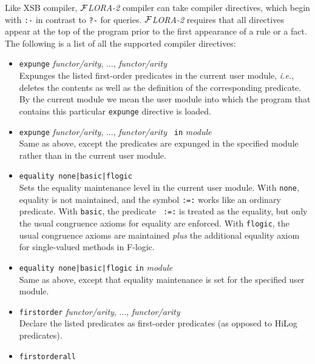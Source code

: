 \documentclass[11pt]{article}
\newcommand{\FLORA}{{\mbox{${\cal F}${\small\it LORA}\rm\emph{-2}}}\xspace}
\newcommand{\fl}{\mbox{F-logic}\xspace}
\begin{document}
%
%
Like XSB compiler, \FLORA compiler can take compiler directives, which
begin with {\tt :-} in contrast to {\tt ?-} for queries.  \FLORA requires
that all directives appear at the top of the program prior to the first
appearance of a rule or a fact.  The following is a list of all the supported
compiler directives:
\begin{itemize}
\item {\tt expunge} {\em functor/arity}, ..., {\em functor/arity}
  \\
  Expunges the listed first-order predicates in the current user
  module, {\it i.e.}, deletes the contents as well as the definition of the
  corresponding predicate. By the current module we mean the user module into
  which the program that contains this particular {\tt expunge} directive
  is loaded.
\item {\tt expunge} {\em functor/arity}, ..., {\em functor/arity} {\tt
    in} \emph{module}\\
  Same as above, except the predicates are expunged in the specified
    module rather than in the current user module.
  \item {\tt equality none|basic|flogic}
    \\
    Sets the equality maintenance level in the current user module.
    With {\tt none}, equality is not maintained, and the symbol {\tt :=:}
    works like an ordinary predicate.  With {\tt basic}, the predicate {\tt
      :=:} is treated as the equality, but only the usual congruence axioms
    for equality are enforced. With {\tt flogic}, the usual congruence
    axioms are maintained \emph{plus} the additional equality axiom for
    single-valued methods in \fl.
\item {\tt equality none|basic|flogic} {\tt in}  \emph{module}
  \\
  Same as above, except that equality maintenance is set for the specified
  user module.
\item {\tt firstorder} {\em functor/arity}, ..., {\em functor/arity}
  \\
  Declare the listed predicates as first-order predicates (as opposed to HiLog
  predicates).
\item {\tt firstorderall}

\end{itemize}
\end{document}
